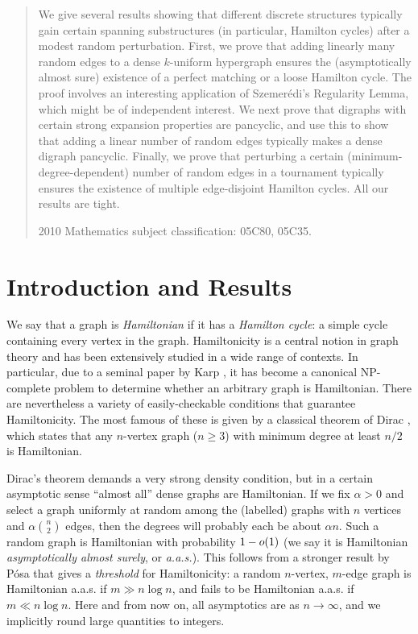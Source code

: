 \documentclass[11pt,english]{article}
\theoremstyle{plain}
\theoremstyle{definition}
\theoremstyle{definition}
\theoremstyle{plain}
\theoremstyle{plain}
\theoremstyle{plain}
\theoremstyle{plain}
\theoremstyle{remark}
\theoremstyle{remark}
\let\originalleft\left
\let\originalright\right
\renewcommand{\left}{\mathopen{}\mathclose\bgroup\originalleft}
\renewcommand{\right}{\aftergroup\egroup\originalright}
\begin{document}
\begin{abstract}
We give several results showing that different discrete structures typically
gain certain spanning substructures (in particular, Hamilton cycles) after a modest random perturbation. First, we prove
that adding linearly many random edges to a dense $k$-uniform hypergraph ensures
the (asymptotically almost sure) existence of a perfect matching or a loose
Hamilton cycle. The proof involves an interesting application of Szemer\'edi's
Regularity Lemma, which might be of independent interest. We next prove that digraphs with certain strong expansion
properties are pancyclic, and use this to show that adding a linear
number of random edges typically makes a dense digraph pancyclic. Finally, we
prove that perturbing a certain (minimum-degree-dependent) number of
random edges in a tournament typically ensures the existence of multiple edge-disjoint
Hamilton cycles. All our results are tight.

2010 Mathematics subject classification:
05C80, %
05C35.%

\end{abstract}

\section{Introduction and Results}

We say that a graph is \emph{Hamiltonian} if it has a \emph{Hamilton
cycle}: a simple cycle containing every vertex in the graph. Hamiltonicity
is a central notion in graph theory and has been extensively studied
in a wide range of contexts. In particular, due to a seminal paper
by Karp \cite{Kar72}, it has become a canonical NP-complete problem
to determine whether an arbitrary graph is Hamiltonian. There are
nevertheless a variety of easily-checkable conditions that guarantee
Hamiltonicity. The most famous of these is given by a classical theorem
of Dirac \cite{Dir52}, which states that any $n$-vertex graph ($n\ge 3$) with
minimum degree at least $n/2$ is Hamiltonian.

Dirac's theorem demands a very strong density condition, but in a
certain asymptotic sense ``almost all'' dense graphs are Hamiltonian.
If we fix $\alpha>0$ and select a graph uniformly at random among
the (labelled) graphs with $n$ vertices and $\alpha{n \choose 2}$
edges, then the degrees will probably each be about $\alpha n$. Such
a random graph is Hamiltonian with probability $1-o\left(1\right)$
(we say it is Hamiltonian \emph{asymptotically almost surely}, or
\emph{a.a.s.}). This follows from a stronger result by P\'osa \cite{Pos76}
that gives a \emph{threshold} for Hamiltonicity: a random $n$-vertex,
$m$-edge graph is Hamiltonian a.a.s.{} if $m\gg n\log n$, and fails
to be Hamiltonian a.a.s.{} if $m\ll n\log n$. Here and from now on,
all asymptotics are as $n\to\infty$, and we implicitly round large
quantities to integers.
\end{document}
